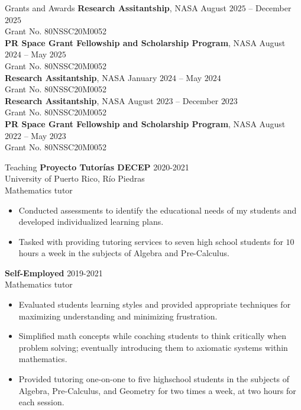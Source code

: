 \documentclass{resume}
\begin{document}
\begin{rSection}{Grants and Awards}
  \textbf{Research Assitantship}, NASA
  \hfill{August $2025$ -- December $2025$} \\
  Grant No. 80NSSC20M0052 \\

  \textbf{PR Space Grant Fellowship and Scholarship Program}, NASA
  \hfill{August $2024$ -- May $2025$} \\
  Grant No. 80NSSC20M0052 \\

  \textbf{Research Assitantship}, NASA
  \hfill{January $2024$ -- May $2024$} \\
  Grant No. 80NSSC20M0052 \\

  \textbf{Research Assitantship}, NASA
  \hfill{August $2023$ -- December $2023$} \\
  Grant No. 80NSSC20M0052 \\

  \textbf{PR Space Grant Fellowship and Scholarship Program}, NASA
  \hfill{August $2022$ -- May $2023$} \\
  Grant No. 80NSSC20M0052 \\
\end{rSection}

\begin{rSection}{Teaching}
  \textbf{Proyecto Tutor\'ias DECEP} \hfill{2020-2021} \\
  University of Puerto Rico, R\'io Piedras \\
  Mathematics tutor
  \begin{itemize}
    \item[] Conducted assessments to identify the educational needs of my
      students and developed individualized learning plans.

    \item[] Tasked with providing tutoring services to seven high school
      students for $10$ hours a week in the subjects of Algebra and
      Pre-Calculus.
  \end{itemize}

  \textbf{Self-Employed} \hfill{2019-2021} \\
  Mathematics tutor

  \begin{itemize}
    \item[] Evaluated students learning styles and provided appropriate
      techniques for maximizing understanding and minimizing frustration.

    \item[] Simplified math concepts while coaching students to think
      critically when problem solving; eventually introducing them to
      axiomatic systems within mathematics.

    \item[] Provided tutoring one-on-one to five highschool students in the
      subjects of Algebra, Pre-Calculus, and Geometry for two times a
      week, at two hours for each session.
  \end{itemize}
\end{rSection}
\end{document}
